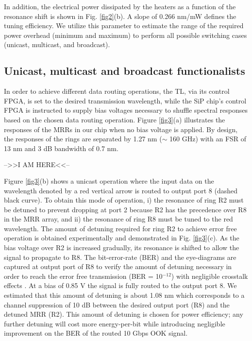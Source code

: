 In addition, the electrical power dissipated by the heaters as a function of the resonance shift is shown in Fig. \ref{fig2}(b). A slope of 0.266 nm/mW defines the tuning efficiency. We utilize this parameter to estimate the range of the required power overhead (minimum and maximum) to perform all possible switching cases (unicast, multicast, and broadcast).

\subsection{Unicast, multicast and broadcast functionalists}

In order to achieve different data routing operations, the TL, via its control FPGA, is set to the desired transmission wavelength, while the SiP chip's control FPGA is instructed to supply bias voltages necessary to shuffle spectral responses based on the chosen data routing operation. Figure \ref{fig3}(a) illustrates the responses of the MRRs in our chip when no bias voltage is applied. By design, the responses of the rings are separated by 1.27 nm ($\sim$ 160 GHz) with an FSR of 13 nm and 3 dB bandwidth of 0.7 nm.

-->>I AM HERE<<--

Figure \ref{fig3}(b) shows a unicast operation where the input data on the wavelength denoted by a red vertical arrow is routed to output port 8 (dashed black curve). To obtain this mode of operation, i) the resonance of ring R2 must be detuned to prevent dropping at port 2 because R2 has the precedence over R8 in the MRR array, and ii) the resonance of ring R8 must be tuned to the red wavelength. The amount of detuning required for ring R2 to achieve error free operation is obtained experimentally and demonstrated in Fig. \ref{fig3}(c). As the bias voltage over R2 is increased gradually, its resonance is shifted to allow the signal to propagate to R8. The bit-error-rate (BER) and the eye-diagrams are captured at output port of R8 to verify the amount of detuning necessary in order to reach the error free transmission (BER = 10$^{-12}$) with negligible crosstalk effects \cite{bahadori2016crosstalk}. At a bias of 0.85 V the signal is fully routed to the output port 8. We estimated that this amount of detuning is about 1.08 nm which corresponds to a channel suppression of 10 dB between the desired output port (R8) and the detuned MRR (R2). This amount of detuning is chosen for power efficiency; any further detuning will cost more energy-per-bit while introducing negligible improvement on the BER of the routed 10 Gbps OOK signal. 

